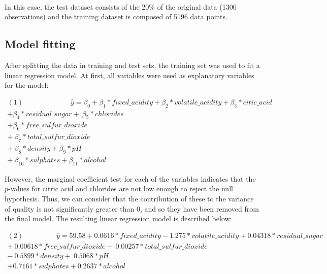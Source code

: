 \documentclass[10pt]{article}
\begin{document}
\paragraph*{}
In this case, the test dataset consists of the 20\% of the original data (1300 observations) and the training dataset is composed of 5196 data points.

\subsection{Model fitting}
After splitting the data in training and test sets, the training set was used to fit a linear regression model. At first, all variables were used as explanatory variables for the model:

\begin{equation*}
\begin{aligned}	
(1) \ \ \ \  \ \ \ \ \ \ \ \ \ \ \ \ \ \ \ \ \ \ \ \ \ \ \ \ \ \ \hat{y} = \beta_0 + \beta_1*fixed\_acidity + \beta_2*volatile\_acidity 
+ \beta_3*citic\_acid  \\ +\beta_4*residual\_sugar 
+ \ \beta_5*chlorides\\ + \beta_6*free\_sulfur\_dioxide  \\+ \ \beta_7*total\_sulfur\_dioxide   
\\ + \ \beta_8*density + \beta_9*pH  \\+ \ \beta_{10}*sulphates + \beta_{11}*alcohol 	
\end{aligned}
\end{equation*}

However, the marginal coefficient test for each of the variables indicates that the $p$-values for citric acid and chlorides are not low enough to reject the null hypothesis. Thus, we can consider that the contribution of these to the variance of quality is not significantly greater than 0, and so they have been removed from the final model. The resulting linear regression model is described below:

\begin{equation*}
\begin{aligned}	
(2) \ \ \ \  \ \ \ \ \ \ \ \ \ \ \ \ \ \ \ \ \  \hat{y} = 59.58 + 0.0616*fixed\_acidity  -1.275*volatile\_acidity 
+0.04318*residual\_sugar \\
+ \  0.00618*free\_sulfur\_dioxide  - \ 0.00257*total\_sulfur\_dioxide   
\\ - \ 0.5899*density  + \ 0.5068*pH   \\+ 0.7161*sulphates + 0.2637*alcohol
\end{aligned}
\end{equation*}
\end{document}
